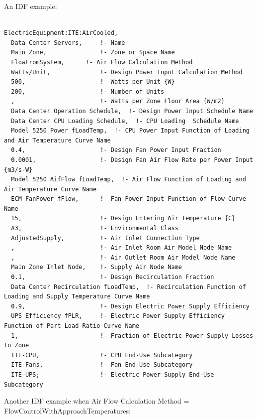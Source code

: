 An IDF example:

\begin{lstlisting}

ElectricEquipment:ITE:AirCooled,
  Data Center Servers,     !- Name
  Main Zone,               !- Zone or Space Name
  FlowFromSystem,      !- Air Flow Calculation Method
  Watts/Unit,              !- Design Power Input Calculation Method
  500,                     !- Watts per Unit {W}
  200,                     !- Number of Units
  ,                        !- Watts per Zone Floor Area {W/m2}
  Data Center Operation Schedule,  !- Design Power Input Schedule Name
  Data Center CPU Loading Schedule,  !- CPU Loading  Schedule Name
  Model 5250 Power fLoadTemp,  !- CPU Power Input Function of Loading and Air Temperature Curve Name
  0.4,                     !- Design Fan Power Input Fraction
  0.0001,                  !- Design Fan Air Flow Rate per Power Input {m3/s-W}
  Model 5250 AifFlow fLoadTemp,  !- Air Flow Function of Loading and Air Temperature Curve Name
  ECM FanPower fFlow,      !- Fan Power Input Function of Flow Curve Name
  15,                      !- Design Entering Air Temperature {C}
  A3,                      !- Environmental Class
  AdjustedSupply,          !- Air Inlet Connection Type
  ,                        !- Air Inlet Room Air Model Node Name
  ,                        !- Air Outlet Room Air Model Node Name
  Main Zone Inlet Node,    !- Supply Air Node Name
  0.1,                     !- Design Recirculation Fraction
  Data Center Recirculation fLoadTemp,  !- Recirculation Function of Loading and Supply Temperature Curve Name
  0.9,                     !- Design Electric Power Supply Efficiency
  UPS Efficiency fPLR,     !- Electric Power Supply Efficiency Function of Part Load Ratio Curve Name
  1,                       !- Fraction of Electric Power Supply Losses to Zone
  ITE-CPU,                 !- CPU End-Use Subcategory
  ITE-Fans,                !- Fan End-Use Subcategory
  ITE-UPS;                 !- Electric Power Supply End-Use Subcategory
\end{lstlisting}

Another IDF example when Air Flow Calculation Method = FlowControlWithApproachTemperatures:

